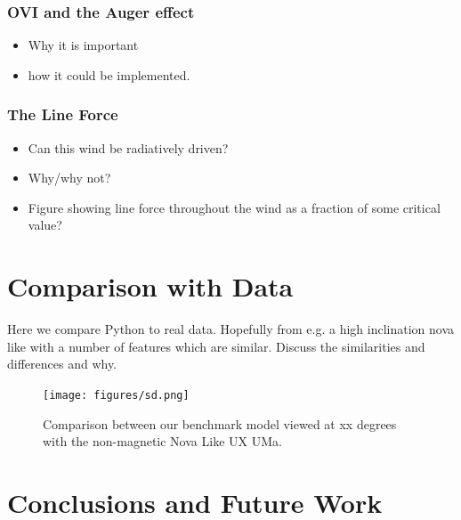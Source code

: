 \documentclass[preprint, a4paper, 11pt]{aastex}
\begin{document}
\subsubsection{OVI and the Auger effect}
\begin{itemize}
\item Why it is important
\item how it could be implemented.
\end{itemize}

\subsubsection{The Line Force}
\begin{itemize}
\item Can this wind be radiatively driven? 
\item Why/why not?
\item Figure showing line force throughout the wind as a fraction of some critical value?
\end{itemize}


\newpage

%
%

\section{Comparison with Data}

Here we compare Python to real data. Hopefully from e.g. a high inclination 
nova like with a number of features which are similar. Discuss the 
similarities and differences and why.

\begin{figure}[!h]
\texttt{[image: figures/sd.png]}
\caption{Comparison between our benchmark model viewed at xx degrees with the 
non-magnetic Nova Like UX UMa.}
\end{figure}





\newpage
%
%


\section{Conclusions and Future Work}

\end{document}
